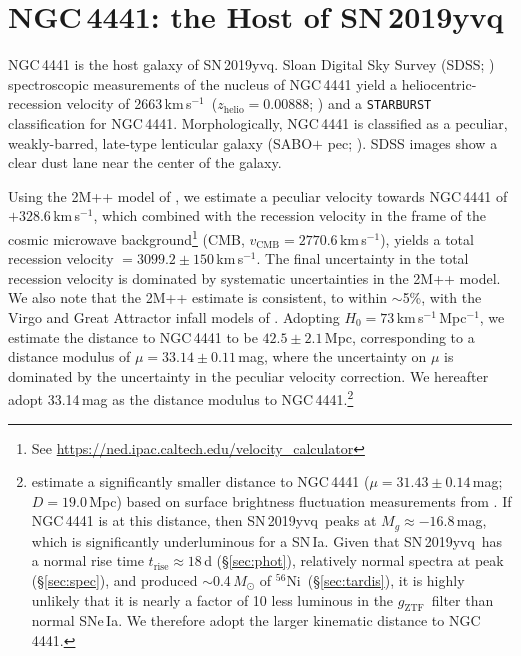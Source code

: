 \documentclass[twocolumn]{aastex63}
\newcommand{\fromkate}[1]{{\color{brown} fromKM: {#1}}}
\newcommand{\todo}[1]{{\color{magenta} to-do: {#1}}}
\newcommand{\gztf}{$g_\mathrm{ZTF}$}
\newcommand{\kms}{km\,s$^{-1}$}
\newcommand{\radni}{$^{56}$Ni}
\newcommand{\sn}{SN\,2019yvq}
\begin{document}
\section{NGC\,4441: the Host of \sn}\label{sec:host}

NGC\,4441 is the host galaxy of \sn. Sloan Digital Sky Survey (SDSS;
\citealt{York00}) spectroscopic measurements of the nucleus of NGC\,4441
yield a heliocentric-recession velocity of 2663\,\kms\ ($z_\mathrm{helio} =
0.00888$; \citealt{Abolfathi18}) and a \texttt{STARBURST} classification for
NGC\,4441. Morphologically, NGC\,4441 is classified as a peculiar,
weakly-barred, late-type lenticular galaxy (SABO$+$ pec;
\citealt{de-Vaucouleurs91}). SDSS images show a clear dust lane near the
center of the galaxy.

Using the 2M++ model of
\citet{Carrick15}, we estimate a peculiar velocity towards NGC\,4441 of
$+328.6$\,\kms, which combined with the recession velocity in the frame of
the cosmic microwave background\footnote{See
\url{https://ned.ipac.caltech.edu/velocity_calculator}} (CMB,
$v_\mathrm{CMB} = 2770.6$\,\kms), yields a total recession velocity $=
3099.2 \pm 150$\,\kms. The final uncertainty in the total recession velocity
is dominated by systematic uncertainties in the 2M++ model. We also note
that the 2M++ estimate is consistent, to within $\sim$5\%, with the Virgo
and Great Attractor infall models of \citet{Mould00}. Adopting $H_0 =
73$\,\kms\,Mpc$^{-1}$, we estimate the distance to NGC\,4441 to be $42.5 \pm
2.1$\,Mpc, corresponding to a distance modulus of $\mu = 33.14 \pm
0.11$\,mag, where the uncertainty on $\mu$ is dominated by the uncertainty
in the peculiar velocity correction. We hereafter adopt 33.14\,mag as the
distance modulus to NGC\,4441.\footnote{\citet{Tully13} estimate a
significantly smaller distance to NGC\,4441 ($\mu = 31.43 \pm 0.14$\,mag; $D
= 19.0$\,Mpc) based on surface brightness fluctuation measurements from
\citet{Tonry01}. If NGC\,4441 is at this distance, then \sn\ peaks at $M_g
\approx -16.8$\,mag, which is significantly underluminous for a SN\,Ia.
Given that \sn\ has a normal rise time $t_\mathrm{rise} \approx 18$\,d
(\S\ref{sec:phot}), relatively normal spectra at peak (\S\ref{sec:spec}),
and produced $\sim$0.4\,$M_\odot$ of \radni\ (\S\ref{sec:tardis}), it is
highly unlikely that it is nearly a factor of 10 less luminous in the \gztf\
filter than normal SNe\,Ia. We therefore adopt the larger kinematic distance
to NGC\,4441.}
\end{document}
